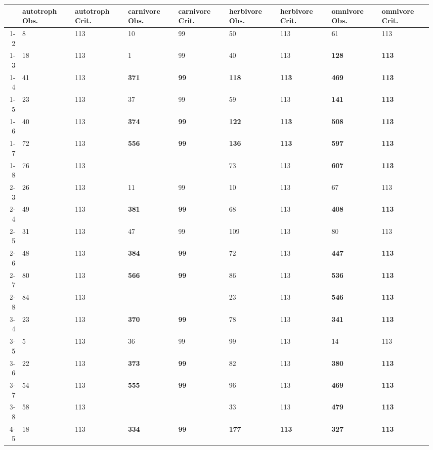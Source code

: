 \begin{table}[ht]
\centering
\begin{tabular}{rllllllll}
  \toprule
 & autotroph Obs. & autotroph Crit. & carnivore Obs. & carnivore Crit. & herbivore Obs. & herbivore Crit. & omnivore Obs. & omnivore Crit. \\ 
  \midrule
1-2 & 8 & 113 & 10 & 99 & 50 & 113 & 61 & 113 \\ 
  1-3 & 18 & 113 & 1 & 99 & 40 & 113 & \textbf{128} & \textbf{113} \\ 
  1-4 & 41 & 113 & \textbf{371} & \textbf{99} & \textbf{118} & \textbf{113} & \textbf{469} & \textbf{113} \\ 
  1-5 & 23 & 113 & 37 & 99 & 59 & 113 & \textbf{141} & \textbf{113} \\ 
  1-6 & 40 & 113 & \textbf{374} & \textbf{99} & \textbf{122} & \textbf{113} & \textbf{508} & \textbf{113} \\ 
  1-7 & 72 & 113 & \textbf{556} & \textbf{99} & \textbf{136} & \textbf{113} & \textbf{597} & \textbf{113} \\ 
  1-8 & 76 & 113 &  &  & 73 & 113 & \textbf{607} & \textbf{113} \\ 
  2-3 & 26 & 113 & 11 & 99 & 10 & 113 & 67 & 113 \\ 
  2-4 & 49 & 113 & \textbf{381} & \textbf{99} & 68 & 113 & \textbf{408} & \textbf{113} \\ 
  2-5 & 31 & 113 & 47 & 99 & 109 & 113 & 80 & 113 \\ 
  2-6 & 48 & 113 & \textbf{384} & \textbf{99} & 72 & 113 & \textbf{447} & \textbf{113} \\ 
  2-7 & 80 & 113 & \textbf{566} & \textbf{99} & 86 & 113 & \textbf{536} & \textbf{113} \\ 
  2-8 & 84 & 113 &  &  & 23 & 113 & \textbf{546} & \textbf{113} \\ 
  3-4 & 23 & 113 & \textbf{370} & \textbf{99} & 78 & 113 & \textbf{341} & \textbf{113} \\ 
  3-5 & 5 & 113 & 36 & 99 & 99 & 113 & 14 & 113 \\ 
  3-6 & 22 & 113 & \textbf{373} & \textbf{99} & 82 & 113 & \textbf{380} & \textbf{113} \\ 
  3-7 & 54 & 113 & \textbf{555} & \textbf{99} & 96 & 113 & \textbf{469} & \textbf{113} \\ 
  3-8 & 58 & 113 &  &  & 33 & 113 & \textbf{479} & \textbf{113} \\ 
  4-5 & 18 & 113 & \textbf{334} & \textbf{99} & \textbf{177} & \textbf{113} & \textbf{327} & \textbf{113} \\ 

\end{tabular}
\end{table}
